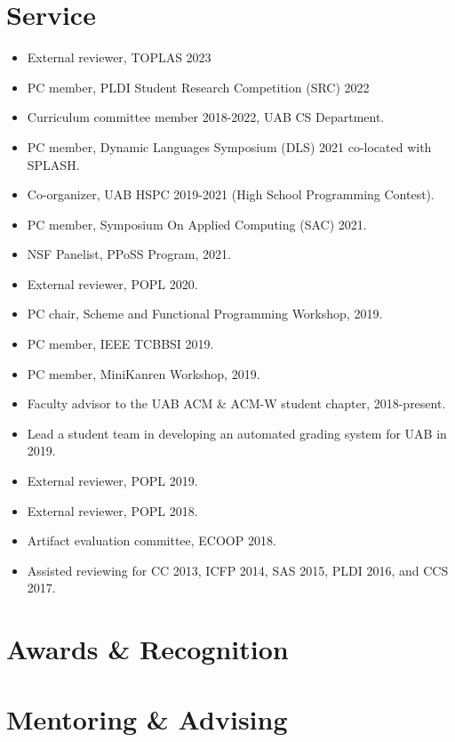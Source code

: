 \documentclass[line]{res}
\begin{document}
\begin{resume}
\section{\large Service} \vspace{0.15in}
\begin{itemize}
    \item External reviewer, TOPLAS 2023
    \item PC member, PLDI Student Research Competition (SRC) 2022
    \item Curriculum committee member 2018-2022, UAB CS Department.
    \item PC member, Dynamic Languages Symposium (DLS) 2021 co-located with SPLASH.
    \item Co-organizer, UAB HSPC 2019-2021 (High School Programming Contest).
    \item PC member, Symposium On Applied Computing (SAC) 2021.
    \item NSF Panelist, PPoSS Program, 2021.
    \item External reviewer, POPL 2020.
    \item PC chair, Scheme and Functional Programming Workshop, 2019.
    \item PC member, IEEE TCBBSI 2019.
    \item PC member, MiniKanren Workshop, 2019.
    \item Faculty advisor to the UAB ACM \& ACM-W student chapter, 2018-present.
    \item Lead a student team in developing an automated grading system for UAB in 2019.
    \item External reviewer, POPL 2019. 
    \item External reviewer, POPL 2018. 
    \item Artifact evaluation committee, ECOOP 2018.
    \item Assisted reviewing for CC 2013, ICFP 2014, SAS 2015, PLDI 2016, and CCS 2017.
\end{itemize}

\section{\large Awards \& Recognition} \vspace{0.2in}


\section{\large Mentoring \& Advising}


\end{resume}
\end{document}
